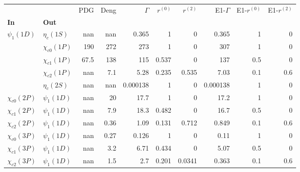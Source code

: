 \begin{tabular}{l|l|r|r|r|r|r|r|r|r}
\toprule
                &                &  PDG &  Deng &  $\Gamma$ &  $r^{(0)}$ &  $r^{(2)}$ &  E1-$\Gamma$ &  E1-$r^{(0)}$ &  E1-$r^{(2)}$ \\
\textbf{In} & \textbf{Out} &      &       &           &            &            &              &               &               \\
\midrule
\textbf{$\psi_{1}(1D)$} & \textbf{$\eta_{c}(1S)$} &  nan &   nan &     0.365 &          1 &          0 &        0.365 &             1 &             0 \\
                & \textbf{$\chi_{c0}(1P)$} &  190 &   272 &       273 &          1 &          0 &          307 &             1 &             0 \\
                & \textbf{$\chi_{c1}(1P)$} & 67.5 &   138 &       115 &      0.537 &          0 &          137 &           0.5 &             0 \\
                & \textbf{$\chi_{c2}(1P)$} &  nan &   7.1 &      5.28 &      0.235 &      0.535 &         7.03 &           0.1 &           0.6 \\
                & \textbf{$\eta_{c}(2S)$} &  nan &   nan &  0.000138 &          1 &          0 &     0.000138 &             1 &             0 \\
\textbf{$\chi_{c0}(2P)$} & \textbf{$\psi_{1}(1D)$} &  nan &    20 &      17.7 &          1 &          0 &         17.2 &             1 &             0 \\
\textbf{$\chi_{c1}(2P)$} & \textbf{$\psi_{1}(1D)$} &  nan &   7.9 &      18.3 &      0.482 &          0 &         16.7 &           0.5 &             0 \\
\textbf{$\chi_{c2}(2P)$} & \textbf{$\psi_{1}(1D)$} &  nan &  0.36 &      1.09 &      0.131 &      0.712 &        0.849 &           0.1 &           0.6 \\
\textbf{$\chi_{c0}(3P)$} & \textbf{$\psi_{1}(1D)$} &  nan &  0.27 &     0.126 &          1 &          0 &         0.11 &             1 &             0 \\
\textbf{$\chi_{c1}(3P)$} & \textbf{$\psi_{1}(1D)$} &  nan &   3.2 &      6.71 &      0.434 &          0 &         5.07 &           0.5 &             0 \\
\textbf{$\chi_{c2}(3P)$} & \textbf{$\psi_{1}(1D)$} &  nan &   1.5 &       2.7 &      0.201 &     0.0341 &        0.363 &           0.1 &           0.6 \\
\bottomrule
\end{tabular}
